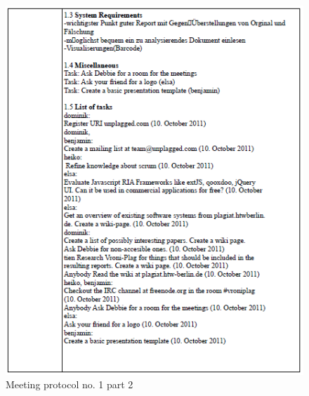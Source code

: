 \begin{appendix}
\begin{figure}
  \centering
    \includegraphics[width=\textwidth]{images/a_meetings/meeting_01b.png}
  \caption{Meeting protocol no. 1 part 2}
  \label{fig:meeting protocol no. 1 part 2}
\end{figure}



\end{appendix}
